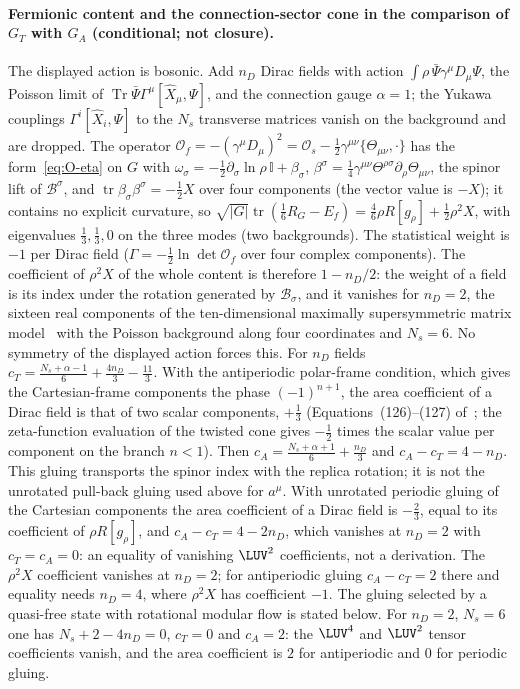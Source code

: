 \paragraph{Fermionic content and the connection-sector cone in the comparison of \(G_T\) with \(G_A\) (conditional; not closure).}

The displayed action is bosonic. Add \(n_D\) Dirac fields with action \(\int\rho\,\bar\Psi\gamma^\mu D_\mu\Psi\), the Poisson limit of \(\operatorname{Tr}\bar\Psi\Gamma^\mu[\hat X_\mu,\Psi]\), and the connection gauge \(\alpha=1\); the Yukawa couplings \(\Gamma^i[\hat X_i,\Psi]\) to the \(N_s\) transverse matrices vanish on the background and are dropped. The operator \(\mathcal O_f=-(\gamma^\mu D_\mu)^2=\mathcal O_s-\tfrac12\gamma^{\mu\nu}\{\Theta_{\mu\nu},\cdot\}\) has the form~\eqref{eq:O-eta} on \(G\) with \(\omega_\sigma=-\tfrac12\partial_\sigma\ln\rho\,\mathbb I+\beta_\sigma\), \(\beta^\sigma=\tfrac14\gamma^{\mu\nu}\Theta^{\rho\sigma}\partial_\rho\Theta_{\mu\nu}\), the spinor lift of \(\mathcal B^\sigma\), and \(\operatorname{tr}\beta_\sigma\beta^\sigma=-\tfrac12X\) over four components (the vector value is \(-X\)); it contains no explicit curvature, so \(\sqrt{|G|}\operatorname{tr}(\tfrac16R_G-E_f)=\tfrac46\rho R[g_\rho]+\tfrac12\rho^2X\), with eigenvalues \(\tfrac13,\tfrac13,0\) on the three modes (two backgrounds). The statistical weight is \(-1\) per Dirac field (\(\Gamma=-\tfrac12\ln\det\mathcal O_f\) over four complex components). The coefficient of \(\rho^2X\) of the whole content is therefore \(1-n_D/2\): the weight of a field is its index under the rotation generated by \(\mathcal B_\sigma\), and it vanishes for \(n_D=2\), the sixteen real components of the ten-dimensional maximally supersymmetric matrix model~\cite{IKKT1997} with the Poisson background along four coordinates and \(N_s=6\). No symmetry of the displayed action forces this. For \(n_D\) fields \(c_T=\tfrac{N_s+\alpha-1}6+\tfrac{4n_D}3-\tfrac{11}3\). With the antiperiodic polar-frame condition, which gives the Cartesian-frame components the phase \((-1)^{n+1}\), the area coefficient of a Dirac field is that of two scalar components, \(+\tfrac13\) (Equations~(126)--(127) of~\cite{Solodukhin2011}; the zeta-function evaluation of the twisted cone gives \(-\tfrac12\) times the scalar value per component on the branch \(n<1\)). Then \(c_A=\tfrac{N_s+\alpha+1}6+\tfrac{n_D}3\) and \(c_A-c_T=4-n_D\). This gluing transports the spinor index with the replica rotation; it is not the unrotated pull-back gluing used above for \(a^\mu\). With unrotated periodic gluing of the Cartesian components the area coefficient of a Dirac field is \(-\tfrac23\), equal to its coefficient of \(\rho R[g_\rho]\), and \(c_A-c_T=4-2n_D\), which vanishes at \(n_D=2\) with \(c_T=c_A=0\): an equality of vanishing \(\LUV^2\) coefficients, not a derivation. The \(\rho^2X\) coefficient vanishes at \(n_D=2\); for antiperiodic gluing \(c_A-c_T=2\) there and equality needs \(n_D=4\), where \(\rho^2X\) has coefficient \(-1\). The gluing selected by a quasi-free state with rotational modular flow is stated below. For \(n_D=2\), \(N_s=6\) one has \(N_s+2-4n_D=0\), \(c_T=0\) and \(c_A=2\): the \(\LUV^4\) and \(\LUV^2\) tensor coefficients vanish, and the area coefficient is \(2\) for antiperiodic and \(0\) for periodic gluing.
